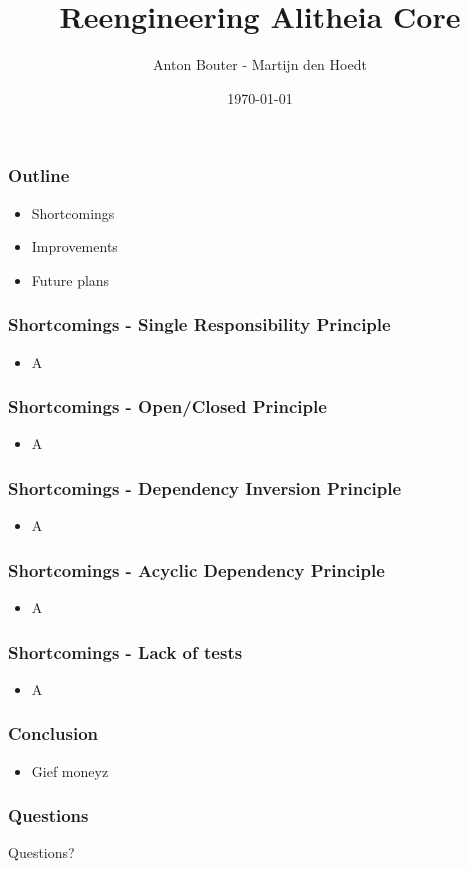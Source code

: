 \documentclass{beamer}
\title[]{Reengineering Alitheia Core}
\institute[TU Delft]{Software Reengineering - IN4189}
\author{Anton Bouter - Martijn den Hoedt}
\date{\today}
\begin{document}
\frame{\titlepage}

\begin{frame}
    \frametitle{Outline}
    \begin{itemize}
        \item Shortcomings
        \item Improvements
        \item Future plans
    \end{itemize}
\end{frame}

\begin{frame}
    \frametitle{Shortcomings - Single Responsibility Principle}
    \begin{itemize}
        \item A
    \end{itemize}
\end{frame}

\begin{frame}
    \frametitle{Shortcomings - Open/Closed Principle}
    \begin{itemize}
        \item A
    \end{itemize}
\end{frame}

\begin{frame}
    \frametitle{Shortcomings - Dependency Inversion Principle}
    \begin{itemize}
        \item A
    \end{itemize}
\end{frame}

\begin{frame}
    \frametitle{Shortcomings - Acyclic Dependency Principle}
    \begin{itemize}
        \item A
    \end{itemize}
\end{frame}

\begin{frame}
    \frametitle{Shortcomings - Lack of tests}
    \begin{itemize}
        \item A
    \end{itemize}
\end{frame}

\begin{frame}
    \frametitle{Conclusion}
    \begin{itemize}
    		\item Gief moneyz
    \end{itemize}
\end{frame}

\begin{frame}
    \frametitle{Questions}
    \hspace{.25\linewidth}
    \Huge{Questions?}
\end{frame}
\end{document}
